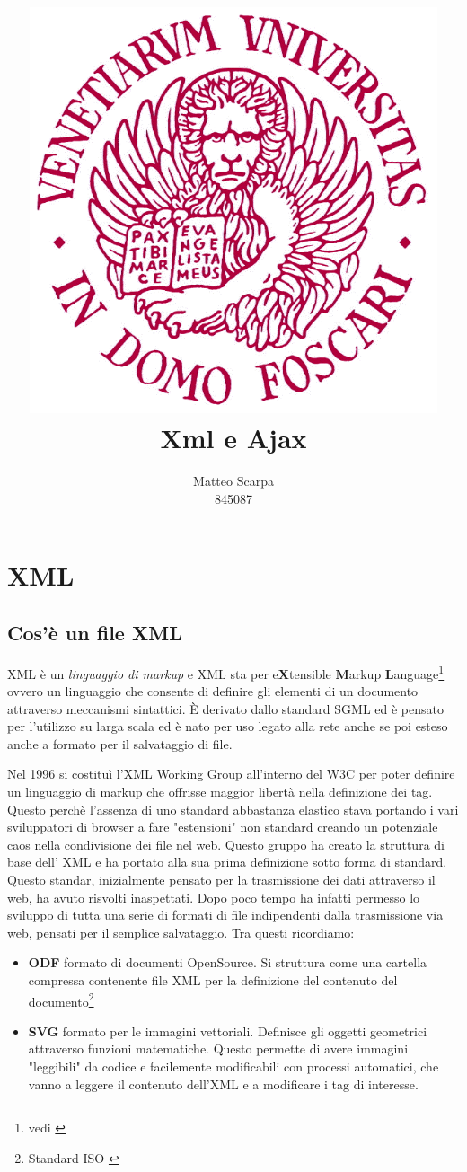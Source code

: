 \documentclass{report}
\title{\includegraphics[width=120mm]{logo-unive.png} \\ Xml e Ajax}
\author{Matteo Scarpa\\ 845087}
\date{}
\begin{document}
\maketitle

\chapter{XML}
\section{Cos'è un file XML}
XML è un \textit{linguaggio di markup} e XML sta per e\textbf{X}tensible \textbf{M}arkup \textbf{L}anguage\footnote{vedi \cite{site:w3cxml}} ovvero un linguaggio che consente di definire gli elementi di un documento attraverso meccanismi sintattici.
È derivato dallo standard SGML  ed è pensato per l'utilizzo su larga scala ed è nato per uso legato alla rete anche se poi esteso anche a formato per il salvataggio di file.

Nel 1996 si costituì l’XML Working Group all'interno del W3C per poter definire un linguaggio di markup che offrisse maggior libertà nella definizione dei tag. Questo perchè l'assenza di uno standard abbastanza elastico stava portando i vari sviluppatori di browser a fare "estensioni" non standard creando un potenziale caos nella condivisione dei file nel web.
Questo gruppo ha creato la struttura di base dell' XML e ha portato alla sua prima definizione sotto forma di standard. 
Questo standar, inizialmente pensato per la trasmissione dei dati attraverso il web, ha avuto risvolti inaspettati. Dopo poco tempo ha infatti permesso lo sviluppo di tutta una serie di formati di file indipendenti dalla trasmissione via web, pensati per il semplice salvataggio. Tra questi ricordiamo: 
\begin{itemize}
\item \textbf{ODF} formato di documenti OpenSource. Si struttura come una cartella compressa contenente file XML per la definizione del contenuto del documento\footnote{Standard ISO \cite{site:isoodf} }
\item \textbf{SVG} formato per le immagini vettoriali. Definisce gli oggetti geometrici attraverso funzioni matematiche. Questo permette di avere immagini "leggibili" da codice e facilemente modificabili con processi automatici, che vanno a leggere il contenuto dell'XML e a modificare i tag di interesse.
\end{itemize}
\end{document}
